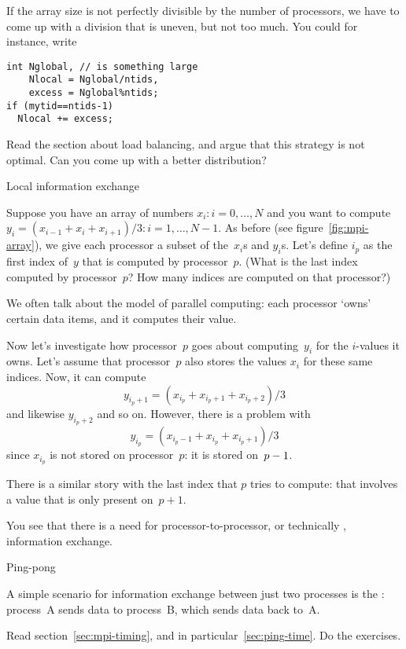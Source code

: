 If the array size is not perfectly divisible by the number of processors,
we have to come up with a division that is uneven, but not too much.
You could for instance, write
\begin{lstlisting}
int Nglobal, // is something large
    Nlocal = Nglobal/ntids,
    excess = Nglobal%ntids;
if (mytid==ntids-1) 
  Nlocal += excess;
\end{lstlisting}

\begin{exercise}
  Read the section  about load balancing, and argue that this strategy
  is not optimal. Can you come up with a better distribution?
\end{exercise}

 {Local information exchange}

Suppose you have an array of numbers $x_i\colon i=0,\ldots,N$
and you want to compute $y_i=(x_{i-1}+x_i+x_{i+1})/3\colon i=1,\ldots,N-1$.
As before (see figure~\ref{fig:mpi-array}), we give each processor
a subset of the~$x_i$s and $y_i$s.
Let's define $i_p$ as the first index of~$y$ that is
computed by processor~$p$. (What is the last index computed by processor~$p$?
How many indices are computed on that processor?)

We often talk about the 
model of parallel computing: each processor `owns' certain data items,
and it computes their value.

Now let's investigate how processor~$p$ goes about computing~$y_i$ for
the $i$-values it owns. Let's assume that processor~$p$ also stores
the values $x_i$ for these same indices.
Now, it can compute
\[ y_{i_p+1} = (x_{i_p}+x_{i_p+1}+x_{i_p+2})/3 \]
and likewise $y_{i_p+2}$ and so on. However, there is a problem with
\[ y_{i_p} = (x_{i_p-1}+x_{i_p}+x_{i_p+1})/3 \]
since $x_{i_p}$ is not stored on processor~$p$: it is stored on~$p-\nobreak1$.

There is a similar story with the last index that $p$ tries to compute:
that involves a value that is only present on~$p+1$.

You see that there is a need for processor-to-processor, or technically ,
information exchange.

 {Ping-pong}

A simple scenario for information exchange between just two processes is the :
process~A sends data to process~B, which sends data back to~A.

Read section~\ref{sec:mpi-timing}, and in particular~\ref{sec:ping-time}. Do the exercises.

